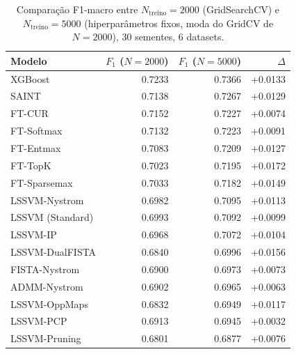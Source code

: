 \begin{table}[ht]
  \centering
  \caption[Comparação F1-macro entre $N_{\text{treino}}=2000$ e $5000$]{Comparação F1-macro entre $N_{\text{treino}}=2000$ (GridSearchCV) e $N_{\text{treino}}=5000$ (hiperparâmetros fixos, moda do GridCV de $N=2000$), 30 sementes, 6 datasets.}
  \label{tab:tier2_n5000_comparison}
  \begin{tabular}{lrrr}
    \toprule
    Modelo & $F_1$ ($N{=}2000$) & $F_1$ ($N{=}5000$) & $\Delta$ \\
    \midrule
    XGBoost & 0.7233 & 0.7366 & +0.0133 \\
    SAINT & 0.7138 & 0.7267 & +0.0129 \\
    FT-CUR & 0.7152 & 0.7227 & +0.0074 \\
    FT-Softmax & 0.7132 & 0.7223 & +0.0091 \\
    FT-Entmax & 0.7083 & 0.7209 & +0.0127 \\
    FT-TopK & 0.7023 & 0.7195 & +0.0172 \\
    FT-Sparsemax & 0.7033 & 0.7182 & +0.0149 \\
    LSSVM-Nystrom & 0.6982 & 0.7095 & +0.0113 \\
    LSSVM (Standard) & 0.6993 & 0.7092 & +0.0099 \\
    LSSVM-IP & 0.6968 & 0.7072 & +0.0104 \\
    LSSVM-DualFISTA & 0.6840 & 0.6996 & +0.0156 \\
    FISTA-Nystrom & 0.6900 & 0.6973 & +0.0073 \\
    ADMM-Nystrom & 0.6902 & 0.6965 & +0.0063 \\
    LSSVM-OppMaps & 0.6832 & 0.6949 & +0.0117 \\
    LSSVM-PCP & 0.6913 & 0.6945 & +0.0032 \\
    LSSVM-Pruning & 0.6801 & 0.6877 & +0.0076 \\
    \bottomrule
  \end{tabular}
\end{table}
